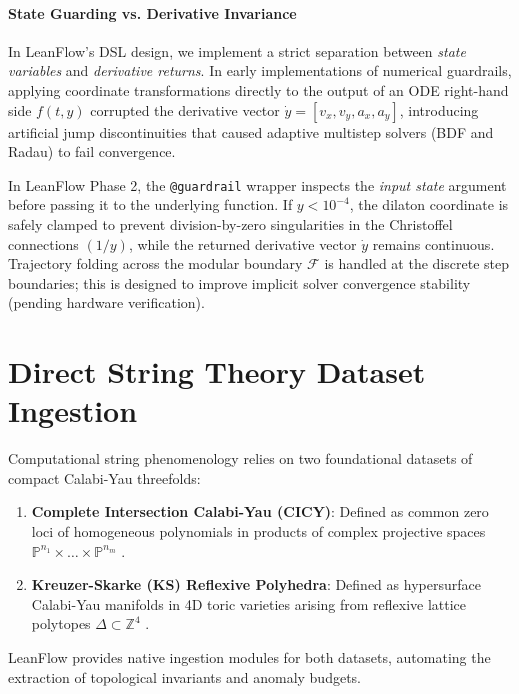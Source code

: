 \documentclass[11pt,a4paper]{article}
\begin{document}
\paragraph{State Guarding vs. Derivative Invariance}
In LeanFlow's DSL design, we implement a strict separation between \emph{state variables} and \emph{derivative returns}. In early implementations of numerical guardrails, applying coordinate transformations directly to the output of an ODE right-hand side $f(t, y)$ corrupted the derivative vector $\dot{y} = [v_x, v_y, a_x, a_y]$, introducing artificial jump discontinuities that caused adaptive multistep solvers (BDF and Radau) to fail convergence.

In LeanFlow Phase 2, the \texttt{@guardrail} wrapper inspects the \emph{input state} argument before passing it to the underlying function. If $y < 10^{-4}$, the dilaton coordinate is safely clamped to prevent division-by-zero singularities in the Christoffel connections $(1/y)$, while the returned derivative vector $\dot{y}$ remains continuous. Trajectory folding across the modular boundary $\mathcal{F}$ is handled at the discrete step boundaries; this is designed to improve implicit solver convergence stability (pending hardware verification).

\section{Direct String Theory Dataset Ingestion}
\label{sec:datasets}

Computational string phenomenology relies on two foundational datasets of compact Calabi-Yau threefolds:
\begin{enumerate}
    \item \textbf{Complete Intersection Calabi-Yau (CICY)}: Defined as common zero loci of homogeneous polynomials in products of complex projective spaces $\mathbb{P}^{n_1} \times \dots \times \mathbb{P}^{n_m}$ \cite{candelas1988}.
    \item \textbf{Kreuzer-Skarke (KS) Reflexive Polyhedra}: Defined as hypersurface Calabi-Yau manifolds in 4D toric varieties arising from reflexive lattice polytopes $\Delta \subset \mathbb{Z}^4$ \cite{kreuzer2000}.
\end{enumerate}

LeanFlow provides native ingestion modules for both datasets, automating the extraction of topological invariants and anomaly budgets.
\end{document}
